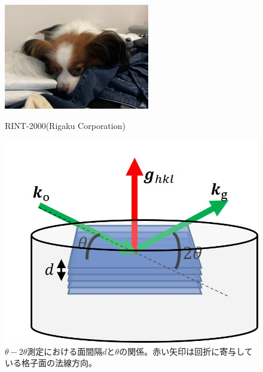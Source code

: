 \documentclass[dvipdfmx,12pt,a4paper]{jreport}
\begin{document}
			\begin{figure}[h]
				\centering
				\begin{minipage}{0.45\hsize}
					\centering
					\includegraphics[width=0.9\linewidth]{sora.jpg}
					\caption{RINT-2000(Rigaku Corporation)}
					\label{XRD_nakajima}
				\end{minipage}
				\begin{minipage}{0.45\hsize}
					\centering
					\includegraphics[scale=0.9]{theta_2theta.jpg}
					\caption{$\theta-2\theta$測定における面間隔$d$と$\theta$の関係。赤い矢印は回折に寄与している格子面の法線方向。}
					\label{XRD_theta_2theta}
				\end{minipage}
			\end{figure}
			\newpage
\end{document}
